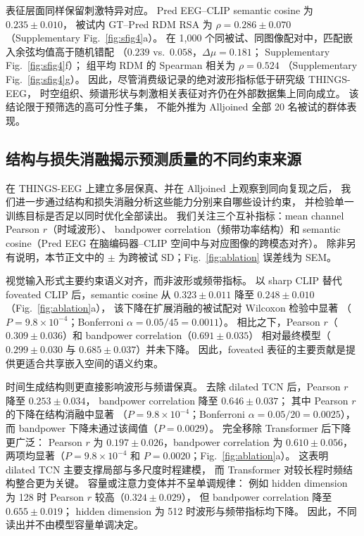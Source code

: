 \documentclass[a4paper,11pt]{article}
\begin{document}
表征层面同样保留刺激特异对应。
Pred EEG--CLIP semantic cosine 为 $0.235\pm0.010$，
被试内 GT--Pred RDM RSA 为 $\rho=0.286\pm0.070$
（Supplementary Fig.~\ref{fig:sfig4}a）。
在 1,000 个同被试、同图像配对中，匹配嵌入余弦均值高于随机错配
（$0.239$ vs.\ $0.058$，$\Delta\mu=0.181$；
Supplementary Fig.~\ref{fig:sfig4}f）；
组平均 RDM 的 Spearman 相关为 $\rho=0.524$
（Supplementary Fig.~\ref{fig:sfig4}g）。
因此，尽管消费级记录的绝对波形指标低于研究级 THINGS-EEG，
时空组织、频谱形状与刺激相关表征对齐仍在外部数据集上同向成立。
该结论限于预筛选的高可分性子集，
不能外推为 Alljoined 全部 20 名被试的群体表现。

\subsection{结构与损失消融揭示预测质量的不同约束来源}
\label{sec:ablation}

在 THINGS-EEG 上建立多层保真、并在 Alljoined 上观察到同向复现之后，
我们进一步通过结构和损失消融分析这些能力分别来自哪些设计约束，
并检验单一训练目标是否足以同时优化全部读出。
我们关注三个互补指标：mean channel Pearson $r$（时域波形）、
bandpower correlation（频带功率结构）和
semantic cosine（Pred EEG 在脑编码器--CLIP 空间中与对应图像的跨模态对齐）。
除非另有说明，本节正文中的 $\pm$ 为跨被试 SD；Fig.~\ref{fig:ablation} 误差线为 SEM。

视觉输入形式主要约束语义对齐，而非波形或频带指标。
以 sharp CLIP 替代 foveated CLIP 后，semantic cosine 从
$0.323\pm0.011$ 降至 $0.248\pm0.010$
（Fig.~\ref{fig:ablation}a），
该下降在扩展消融的被试配对 Wilcoxon 检验中显著
（$P=9.8\times10^{-4}$；Bonferroni $\alpha=0.05/45=0.0011$）。
相比之下，Pearson $r$（$0.309\pm0.036$）和 bandpower correlation（$0.691\pm0.035$）
相对最终模型（$0.299\pm0.030$ 与 $0.685\pm0.037$）并未下降。
因此，foveated 表征的主要贡献是提供更适合共享嵌入空间的语义约束。

时间生成结构则更直接影响波形与频谱保真。
去除 dilated TCN 后，Pearson $r$ 降至 $0.253\pm0.034$，
bandpower correlation 降至 $0.646\pm0.037$；
其中 Pearson $r$ 的下降在结构消融中显著
（$P=9.8\times10^{-4}$；Bonferroni $\alpha=0.05/20=0.0025$），
而 bandpower 下降未通过该阈值（$P=0.0029$）。
完全移除 Transformer 后下降更广泛：
Pearson $r$ 为 $0.197\pm0.026$，bandpower correlation 为 $0.610\pm0.056$，
两项均显著（$P=9.8\times10^{-4}$ 和 $P=0.0020$；Fig.~\ref{fig:ablation}a）。
这表明 dilated TCN 主要支撑局部与多尺度时程建模，
而 Transformer 对较长程时频结构整合更为关键。
容量或注意力变体并不呈单调规律：
例如 hidden dimension 为 128 时 Pearson $r$ 较高（$0.324\pm0.029$），
但 bandpower correlation 降至 $0.655\pm0.019$；
hidden dimension 为 512 时波形与频带指标均下降。
因此，不同读出并不由模型容量单调决定。
\end{document}
